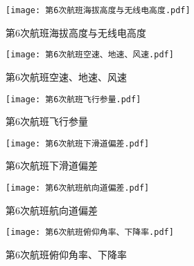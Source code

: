 \documentclass{MathorCupModeling}
\begin{document}
	\begin{figure}[H]
		\centering
		\begin{minipage}{0.48\linewidth}
			\centering
			\texttt{[image: 第6次航班海拔高度与无线电高度.pdf]}
			\caption{第6次航班海拔高度与无线电高度}
			\label{fig:第6次航班海拔高度与无线电高度}
		\end{minipage}
		\begin{minipage}{0.48\linewidth}
			\centering
			\texttt{[image: 第6次航班空速、地速、风速.pdf]}
			\caption{第6次航班空速、地速、风速}
			\label{fig:第6次航班空速、地速、风速}
		\end{minipage}
	\end{figure}
	\begin{figure}[H]
		\centering
		\begin{minipage}{0.48\linewidth}
			\centering
			\texttt{[image: 第6次航班飞行参量.pdf]}
			\caption{第6次航班飞行参量}
			\label{fig:第6次航班飞行参量}
		\end{minipage}
		\begin{minipage}{0.48\linewidth}
			\centering
			\texttt{[image: 第6次航班下滑道偏差.pdf]}
			\caption{第6次航班下滑道偏差}
			\label{fig:第6次航班下滑道偏差}
		\end{minipage}
	\end{figure}
	\begin{figure}[H]
		\centering
		\begin{minipage}{0.48\linewidth}
			\centering
			\texttt{[image: 第6次航班航向道偏差.pdf]}
			\caption{第6次航班航向道偏差}
			\label{fig:第6次航班航向道偏差}
		\end{minipage}
		\begin{minipage}{0.48\linewidth}
			\centering
			\texttt{[image: 第6次航班俯仰角率、下降率.pdf]}
			\caption{第6次航班俯仰角率、下降率}
			\label{fig:第6次航班俯仰角率、下降率}
		\end{minipage}
	\end{figure}
\end{document}
